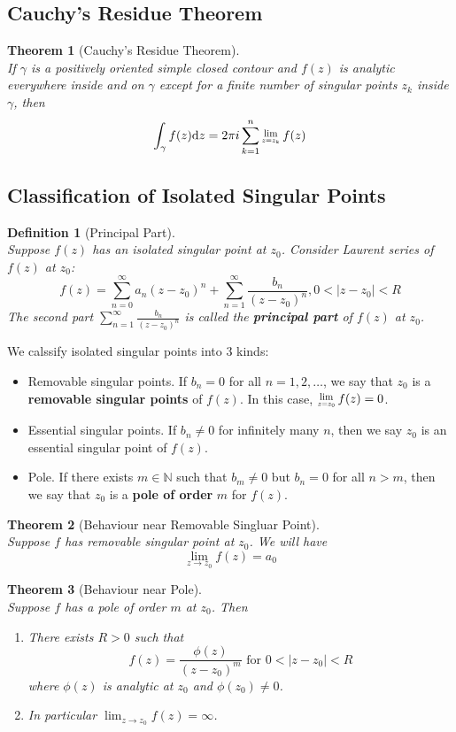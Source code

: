 \documentclass[12pt]{article}
\newcommand{\diff}{\mathrm{d}}
\newcommand{\Res}[1]{\raisebox{0.5ex}{\scalebox{0.8}{$\displaystyle \lim_{#1}\;$}}}
\newtheorem{definition}{Definition}[section]
\newtheorem{theorem}{Theorem}[section]
\theoremstyle{definition}
\begin{document}
\subsection{Cauchy's Residue Theorem}
\begin{theorem}[Cauchy's Residue Theorem]
\hfill\\\normalfont If $\gamma$ is a positively oriented simple closed contour and $f(z)$ is analytic everywhere inside and on $\gamma$ except for a finite number of singular points $z_k$ inside $\gamma$, then
\[
\int_\gamma f(z)\diff z = 2\pi i \sum_{k=1}^n \Res{z=z_k} f(z)
\]
\end{theorem}
\subsection{Classification of Isolated Singular Points}
\begin{definition}[Principal Part]
\hfill\\\normalfont Suppose $f(z)$ has an isolated singular point at $z_0$. Consider Laurent series of $f(z)$ at $z_0$:
\[
f(z) = \sum_{n=0}^\infty a_n(z-z_0)^n + \sum_{n=1}^\infty \frac{b_n}{(z-z_0)^n}, 0<|z-z_0|<R
\]
The second part $\sum_{n=1}^\infty \frac{b_n}{(z-z_0)^n}$ is called the \textbf{principal part} of $f(z)$ at $z_0$.
\end{definition}
We calssify isolated singular points into 3 kinds:
\begin{itemize}
	\item Removable singular points. If $b_n=0$ for all $n=1,2,\ldots$, we say that $z_0$ is a \textbf{removable singular points} of $f(z)$. In this case, $\Res{z=z_0}f(z)=0$.
	\item Essential singular points. If $b_n\neq 0$ for infinitely many $n$, then we say $z_0$ is an essential singular point of $f(z)$.
	\item Pole. If there exists $m\in \mathbb{N}$ such that $b_m\neq 0$ but $b_n=0$ for all $n>m$, then we say that $z_0$ is a \textbf{pole of order} $m$ for $f(z)$.
\end{itemize}
\begin{theorem}[Behaviour near Removable Singluar Point]
\hfill\\\normalfont Suppose $f$ has removable singular point at $z_0$. We will have
\[
\lim_{z\to z_0}f(z) = a_0
\]
\end{theorem}
\begin{theorem}[Behaviour near Pole]
\hfill\\\normalfont Suppose $f$ has a pole of order $m$ at $z_0$. Then 
\begin{enumerate}
	\item There exists $R>0$ such that
	\[
f(z)=\frac{\phi(z)}{(z-z_0)^m}\text{ for }0<|z-z_0|<R
	\]
where $\phi(z)$ is analytic at $z_0$ and $\phi(z_0)\neq 0$.
	\item In particular $\lim_{z\to z_0} f(z) = \infty$.
\end{enumerate}
\end{theorem}
\end{document}

